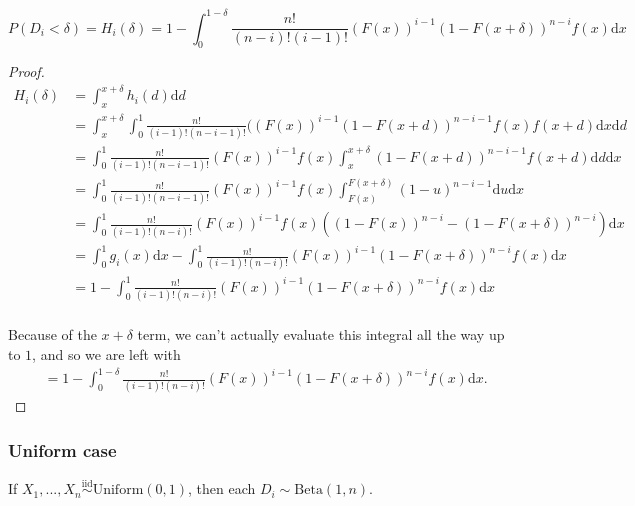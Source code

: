 \documentclass[
  11pt,
]{article}
\begin{document}
\begin{lemma}

\begin{equation}
\label{eq:cdf}
P(D_i < \delta) = H_i(\delta) = 1 - \int_0^{1-\delta} \frac{n!}{(n-i)! (i-1)!} (F(x))^{i-1} (1 - F(x + \delta))^{n-i} f(x) \mathrm{d}x
\end{equation}
\end{lemma}

\begin{proof}
$$
\begin{aligned}
H_i(\delta) & = \int_x^{x+\delta} h_i(d) \mathrm{d}d \\
& = \int_x^{x+\delta} \int_0^{1} \frac{n!}{(i-1)! (n-i-1)!} ((F(x))^{i-1} (1 - F(x+d))^{n-i-1} f(x) f(x+d) \mathrm{d}x \mathrm{d}d \\
& = \int_0^{1} \frac{n!}{(i-1)! (n-i-1)!} (F(x))^{i-1} f(x) \int_x^{x+\delta} (1 - F(x+d))^{n-i-1} f(x+d) \mathrm{d}d \mathrm{d}x \\
& = \int_0^{1} \frac{n!}{(i-1)! (n-i-1)!} (F(x))^{i-1} f(x) \int_{F(x)}^{F(x+\delta)} (1 - u)^{n-i-1} \mathrm{d}u \mathrm{d}x \\
& = \int_0^{1} \frac{n!}{(i-1)! (n-i)!} (F(x))^{i-1} f(x) ((1 - F(x))^{n-i} - (1 - F(x + \delta))^{n-i}) \mathrm{d}x \\ 
& = \int_0^1 g_i(x) \mathrm{d}x - \int_0^1 \frac{n!}{(i-1)! (n-i)!} (F(x))^{i-1} (1 - F(x + \delta))^{n-i} f(x) \mathrm{d}x \\
& = 1 - \int_0^1 \frac{n!}{(i-1)! (n-i)!} (F(x))^{i-1} (1 - F(x + \delta))^{n-i} f(x) \mathrm{d}x \\
\end{aligned}
$$

Because of the $x + \delta$ term, we can't actually evaluate this integral all the way up to $1$, and so we are left with 
$$
\begin{aligned}
& = 1 - \int_0^{1 - \delta} \frac{n!}{(i-1)! (n-i)!} (F(x))^{i-1} (1 - F(x + \delta))^{n-i} f(x) \mathrm{d}x.
\end{aligned}
$$
\end{proof}

\hypertarget{uniform-case}{%
\subsubsection{Uniform case}\label{uniform-case}}

\begin{lemma}
If $X_1, ..., X_n \stackrel{\mathrm{iid}}{\sim}\mathrm{Uniform}(0, 1)$, then each $D_i \sim \mathrm{Beta}(1, n)$.
\end{lemma}
\end{document}
